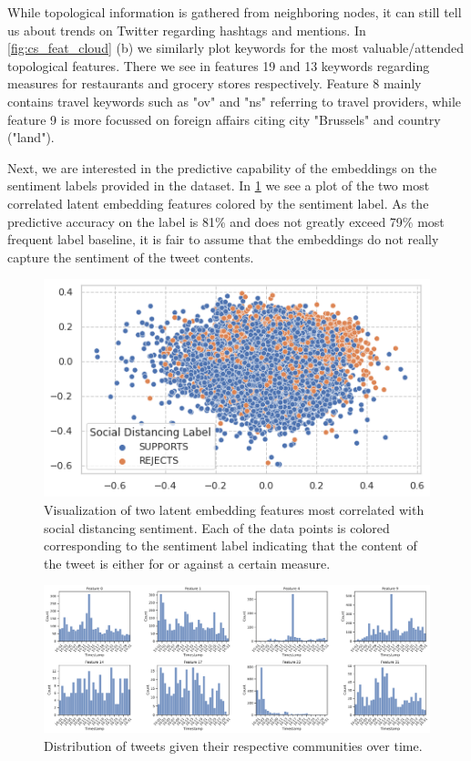 While topological information is gathered from neighboring nodes, it can still tell us about trends on Twitter regarding hashtags and mentions.
In \cref{fig:cs_feat_cloud} (b) we similarly plot keywords for the most valuable/attended topological features.
There we see in features 19 and 13 keywords regarding measures for restaurants and grocery stores respectively.
Feature 8 mainly contains travel keywords such as "ov" and "ns" referring to travel providers, while feature 9 is more focussed on foreign affairs citing city "Brussels" and country ("land").

Next, we are interested in the predictive capability of the embeddings on the sentiment labels provided in the dataset.
In \cref{fig:cs_sentiment_embedding} we see a plot of the two most correlated latent embedding features colored by the sentiment label.
As the predictive accuracy on the label is 81\% and does not greatly exceed 79\% most frequent label baseline, it is fair to assume that the embeddings do not really capture the sentiment of the tweet contents. 

\begin{figure}[]
\centering
\includegraphics[width=0.5\columnwidth]{resources/figs/case_study/08_embedding_sentiment_best.png}
\caption{
    Visualization of two latent embedding features most correlated with social distancing sentiment.
    Each of the data points is colored corresponding to the sentiment label indicating that the content of the tweet is either for or against a certain measure.
}
\label{fig:cs_sentiment_embedding}
\end{figure}

\begin{figure}[]
\centering
\includegraphics[width=\columnwidth]{resources/figs/case_study/09_cluster_timestamp_dist.pdf}
\caption{
    Distribution of tweets given their respective communities over time. 
}
\label{fig:cs_cluster_time_hist}
\end{figure}

